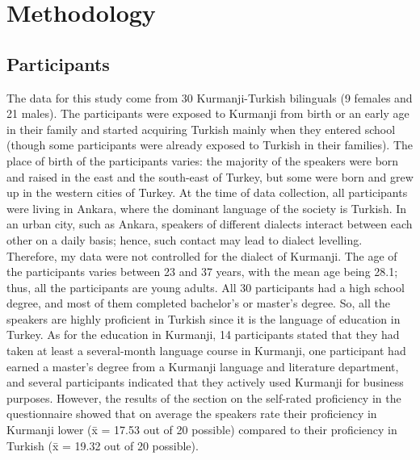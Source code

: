 \documentclass[output=paper,colorlinks,citecolor=brown]{langscibook}
\begin{document}
\section{Methodology}\label{bilingual:ss:5}

\subsection{Participants}\label{bilingual:ss:5.1}

The data for this study come from 30 Kurmanji-Turkish bilinguals (9 females and 21 males). The participants were exposed to Kurmanji from birth or an early age in their family and started acquiring Turkish mainly when they entered school (though some participants were already exposed to Turkish in their families). The place of birth of the participants varies: the majority of the speakers were born and raised in the east and the south-east of Turkey, but some were born and grew up in the western cities of Turkey. At the time of data collection, all participants were living in Ankara, where the dominant language of the society is Turkish. In an urban city, such as Ankara, speakers of different dialects interact between each other on a daily basis; hence, such contact may lead to dialect levelling. Therefore, my data were not controlled for the dialect of Kurmanji. The age of the participants varies between 23 and 37 years, with the mean age being 28.1; thus, all the participants are young adults. All 30 participants had a high school degree, and most of them completed bachelor's or master's degree. So, all the speakers are highly proficient in Turkish since it is the language of education in Turkey. As for the education in Kurmanji, 14 participants stated that they had taken at least a several-month language course in Kurmanji, one participant had earned a master's degree from a Kurmanji language and literature department, and several participants indicated that they actively used Kurmanji for business purposes. However, the results of the section on the self-rated proficiency in the questionnaire showed that on average the speakers rate their proficiency in Kurmanji lower (x̄ = 17.53 out of 20 possible) compared to their proficiency in Turkish (x̄ = 19.32 out of 20 possible). 
\end{document}
